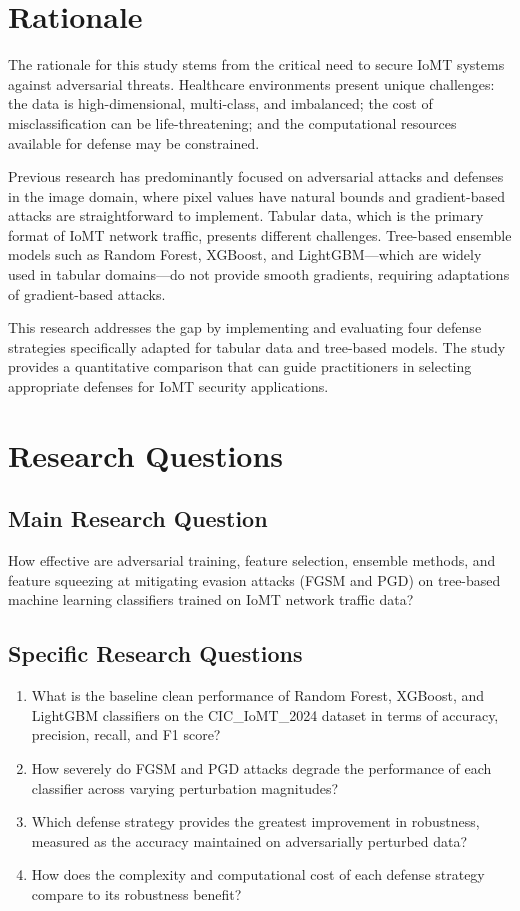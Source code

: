 \documentclass[12pt,a4paper,oneside]{report}
\begin{document}
\section{Rationale}

The rationale for this study stems from the critical need to secure IoMT systems against adversarial threats. Healthcare environments present unique challenges: the data is high-dimensional, multi-class, and imbalanced; the cost of misclassification can be life-threatening; and the computational resources available for defense may be constrained.

Previous research has predominantly focused on adversarial attacks and defenses in the image domain, where pixel values have natural bounds and gradient-based attacks are straightforward to implement. Tabular data, which is the primary format of IoMT network traffic, presents different challenges. Tree-based ensemble models such as Random Forest, XGBoost, and LightGBM---which are widely used in tabular domains---do not provide smooth gradients, requiring adaptations of gradient-based attacks.

This research addresses the gap by implementing and evaluating four defense strategies specifically adapted for tabular data and tree-based models. The study provides a quantitative comparison that can guide practitioners in selecting appropriate defenses for IoMT security applications.

\section{Research Questions}

\subsection{Main Research Question}

How effective are adversarial training, feature selection, ensemble methods, and feature squeezing at mitigating evasion attacks (FGSM and PGD) on tree-based machine learning classifiers trained on IoMT network traffic data?

\subsection{Specific Research Questions}

\begin{enumerate}[label=\textbf{RQ\arabic*:}]
    \item What is the baseline clean performance of Random Forest, XGBoost, and LightGBM classifiers on the CIC\_IoMT\_2024 dataset in terms of accuracy, precision, recall, and F1 score?
    \item How severely do FGSM and PGD attacks degrade the performance of each classifier across varying perturbation magnitudes?
    \item Which defense strategy provides the greatest improvement in robustness, measured as the accuracy maintained on adversarially perturbed data?
    \item How does the complexity and computational cost of each defense strategy compare to its robustness benefit?
\end{enumerate}
\end{document}
